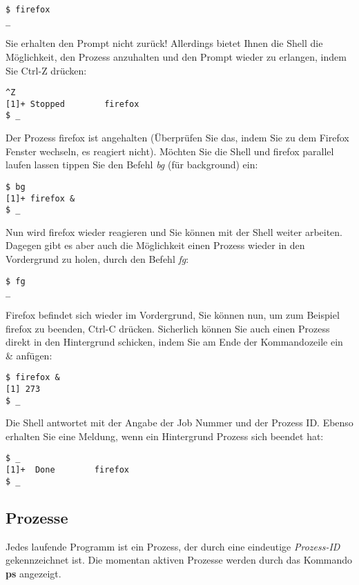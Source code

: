 \documentclass[titlepage,a4paper]{article}
\begin{document}
\begin{verbatim}
$ firefox
_
\end{verbatim}

Sie erhalten den Prompt nicht zurück!  Allerdings bietet Ihnen die Shell die
Möglichkeit, den Prozess anzuhalten und den Prompt wieder zu erlangen, indem
Sie Ctrl-Z drücken:

\begin{verbatim}
^Z
[1]+ Stopped        firefox
$ _
\end{verbatim}

Der Prozess firefox ist angehalten (Überprüfen Sie das, indem Sie zu
dem Firefox Fenster wechseln, es reagiert nicht).  Möchten Sie die Shell und
firefox parallel laufen lassen tippen Sie den Befehl \emph{bg} (für
background) ein:

\begin{verbatim}
$ bg
[1]+ firefox &
$ _
\end{verbatim}

Nun wird firefox wieder reagieren und Sie können mit der Shell weiter
arbeiten.  Dagegen gibt es aber auch die Möglichkeit einen Prozess wieder in
den Vordergrund zu holen, durch den Befehl \emph{fg}:

\begin{verbatim}
$ fg
_
\end{verbatim}

Firefox befindet sich wieder im Vordergrund, Sie können nun, um zum Beispiel
firefox zu beenden, Ctrl-C drücken.  Sicherlich können Sie auch einen Prozess
direkt in den Hintergrund schicken, indem Sie am Ende der Kommandozeile ein \&
anfügen:

\begin{verbatim}
$ firefox &
[1] 273
$ _
\end{verbatim}

Die Shell antwortet mit der Angabe der Job Nummer und der Prozess ID.  Ebenso
erhalten Sie eine Meldung, wenn ein Hintergrund Prozess sich beendet hat:

\begin{verbatim}
$ _
[1]+  Done        firefox
$ _
\end{verbatim}

\subsection{Prozesse}

Jedes laufende Programm ist ein Prozess, der durch eine eindeutige
\emph{Prozess-ID} gekennzeichnet ist.  Die momentan aktiven Prozesse werden
durch das Kommando \textbf{ps} angezeigt.
\end{document}
